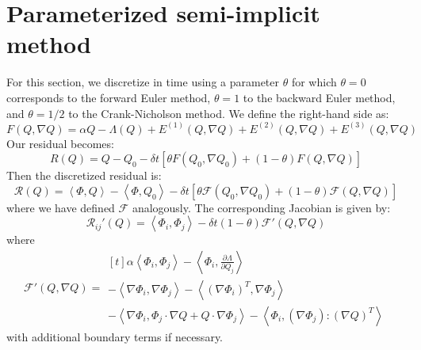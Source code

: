 \documentclass[reqno]{article}
\begin{document}
\section{Parameterized semi-implicit method}
For this section, we discretize in time using a parameter $\theta$ for which $\theta = 0$ corresponds to the forward Euler method, $\theta = 1$ to the backward Euler method, and $\theta = 1/2$ to the Crank-Nicholson method.
We define the right-hand side as:
\begin{equation}
    F(Q, \nabla Q)
    =
    \alpha Q
    - \Lambda(Q)
    + E^{(1)}(Q, \nabla Q)
    + E^{(2)}(Q, \nabla Q)
    + E^{(3)}(Q, \nabla Q)
\end{equation}
Our residual becomes:
\begin{equation}
    R(Q)
    =
    Q - Q_0
    - \delta t
    \left[ \theta F(Q_0, \nabla Q_0) + (1 - \theta) F(Q, \nabla Q) \right]
\end{equation}
Then the discretized residual is:
\begin{equation}
    \mathcal{R}(Q)
    =
    \left< \Phi, Q \right>
    - \left< \Phi, Q_0 \right>
    - \delta t \left[ \theta \mathcal{F}(Q_0, \nabla Q_0) + (1 - \theta) \mathcal{F}(Q, \nabla Q) \right]
\end{equation}
where we have defined $\mathcal{F}$ analogously.
The corresponding Jacobian is given by:
\begin{equation}
    \mathcal{R}_{ij}'(Q)
    =
    \left< \Phi_i, \Phi_j \right>
    - \delta t (1 - \theta) \mathcal{F}'(Q, \nabla Q)
\end{equation}
where
\begin{equation}
    \mathcal{F}'(Q, \nabla Q)
    =
    \begin{multlined}[t]
    \alpha \left< \Phi_i, \Phi_j \right>
    - \left< \Phi_i, \frac{\partial \Lambda}{\partial Q_j} \right> \\
    - \left< \nabla \Phi_i, \nabla \Phi_j \right>
    - \left< \left(\nabla \Phi_i \right)^T, \nabla \Phi_j \right> \\
    - \left< \nabla \Phi_i, \Phi_j \cdot \nabla Q + Q \cdot \nabla \Phi_j \right>
    - \left< \Phi_i, \left(\nabla \Phi_j\right) : \left(\nabla Q \right)^T \right>
    \end{multlined}
\end{equation}
with additional boundary terms if necessary.
\end{document}
